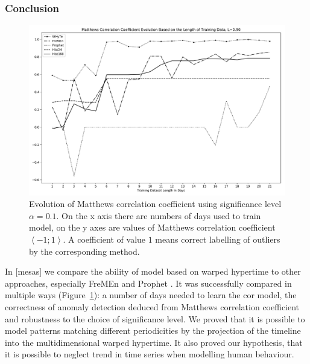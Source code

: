 \subsubsection{Conclusion}
\begin{figure}[htb]
\begin{center}
    \includegraphics[width=1.0\columnwidth]{fig/mathew_graph_90}
    \caption{Evolution of Matthews correlation coefficient using significance level $\alpha=0.1$. On the x axis there are numbers of days used to train model, on the y axes are values of Matthews correlation coefficient $\left<-1;1\right>$. A coefficient of value $1$ means correct labelling of outliers by the corresponding method.   \label{graph:mathew90}}

\end{center}
\end{figure}

In [mesas] we compare the ability of model based on warped hypertime to other approaches, especially FreMEn \cite{krajnik2017fremen} and Prophet \cite{taylor2018forecasting}. 
It was successfully compared in multiple ways (Figure~\ref{graph:mathew90}): a number of days needed to learn the cor model, the correctness of anomaly detection deduced from Matthews correlation coefficient \cite{matthews1975comparison} and robustness to the choice of significance level.
We proved that it is possible to model patterns matching different periodicities by the projection of the timeline into the multidimensional warped hypertime.
It also proved our hypothesis, that it is possible to neglect trend in time series when modelling human behaviour.





